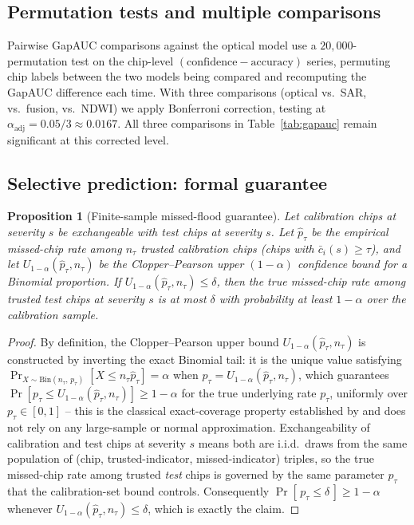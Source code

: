 \documentclass{article}
\newtheorem{proposition}{Proposition}
\begin{document}
\subsection{Permutation tests and multiple comparisons}
Pairwise GapAUC comparisons against the optical model use a $20{,}000$-permutation test on the chip-level $(\text{confidence}-\text{accuracy})$ series, permuting chip labels between the two models being compared and recomputing the GapAUC difference each time. With three comparisons (optical vs.\ SAR, vs.\ fusion, vs.\ NDWI) we apply Bonferroni correction, testing at $\alpha_{\text{adj}} = 0.05/3 \approx 0.0167$. All three comparisons in Table~\ref{tab:gapauc} remain significant at this corrected level.

\subsection{Selective prediction: formal guarantee}
\label{app:proposition}

\begin{proposition}[Finite-sample missed-flood guarantee]
\label{prop:selective}
Let calibration chips at severity $s$ be exchangeable with test chips at severity $s$. Let $\hat p_\tau$ be the empirical missed-chip rate among $n_\tau$ trusted calibration chips (chips with $\bar c_i(s) \ge \tau$), and let $U_{1-\alpha}(\hat p_\tau, n_\tau)$ be the Clopper--Pearson upper $(1-\alpha)$ confidence bound \citep{clopper1934use} for a Binomial proportion. If $U_{1-\alpha}(\hat p_\tau, n_\tau) \le \delta$, then the true missed-chip rate among trusted \emph{test} chips at severity $s$ is at most $\delta$ with probability at least $1-\alpha$ over the calibration sample.
\end{proposition}

\begin{proof}
By definition, the Clopper--Pearson upper bound $U_{1-\alpha}(\hat p_\tau, n_\tau)$ is constructed by inverting the exact Binomial tail: it is the unique value satisfying $\Pr_{X\sim\mathrm{Bin}(n_\tau,\,p_\tau)}[X \le n_\tau \hat p_\tau] = \alpha$ when $p_\tau = U_{1-\alpha}(\hat p_\tau, n_\tau)$, which guarantees $\Pr[p_\tau \le U_{1-\alpha}(\hat p_\tau, n_\tau)] \ge 1-\alpha$ for the true underlying rate $p_\tau$, uniformly over $p_\tau \in [0,1]$ -- this is the classical exact-coverage property established by \citet{clopper1934use} and does not rely on any large-sample or normal approximation. Exchangeability of calibration and test chips at severity $s$ means both are i.i.d.\ draws from the same population of (chip, trusted-indicator, missed-indicator) triples, so the true missed-chip rate among trusted \emph{test} chips is governed by the same parameter $p_\tau$ that the calibration-set bound controls. Consequently $\Pr[\,p_\tau \le \delta\,] \ge 1-\alpha$ whenever $U_{1-\alpha}(\hat p_\tau, n_\tau) \le \delta$, which is exactly the claim.
\end{proof}
\end{document}
